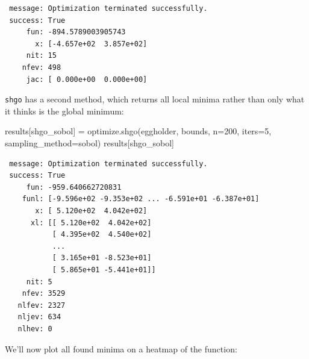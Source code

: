 \documentclass[
  letterpaper,
  DIV=11,
  numbers=noendperiod]{scrreprt}
\newenvironment{Shaded}{\begin{snugshade}}{\end{snugshade}}
\newcommand{\DecValTok}[1]{\textcolor[rgb]{0.68,0.00,0.00}{#1}}
\newcommand{\NormalTok}[1]{\textcolor[rgb]{0.00,0.23,0.31}{#1}}
\newcommand{\OperatorTok}[1]{\textcolor[rgb]{0.37,0.37,0.37}{#1}}
\newcommand{\StringTok}[1]{\textcolor[rgb]{0.13,0.47,0.30}{#1}}
\begin{document}
\begin{verbatim}
 message: Optimization terminated successfully.
 success: True
     fun: -894.5789003905743
       x: [-4.657e+02  3.857e+02]
     nit: 15
    nfev: 498
     jac: [ 0.000e+00  0.000e+00]
\end{verbatim}

\texttt{shgo} has a second method, which returns all local minima rather
than only what it thinks is the global minimum:

\begin{Shaded}
\begin{Highlighting}[]
\NormalTok{results[}\StringTok{\textquotesingle{}shgo\_sobol\textquotesingle{}}\NormalTok{] }\OperatorTok{=}\NormalTok{ optimize.shgo(eggholder, bounds, n}\OperatorTok{=}\DecValTok{200}\NormalTok{, iters}\OperatorTok{=}\DecValTok{5}\NormalTok{,}
\NormalTok{                                      sampling\_method}\OperatorTok{=}\StringTok{\textquotesingle{}sobol\textquotesingle{}}\NormalTok{)}
\NormalTok{results[}\StringTok{\textquotesingle{}shgo\_sobol\textquotesingle{}}\NormalTok{]}
\end{Highlighting}
\end{Shaded}

\begin{verbatim}
 message: Optimization terminated successfully.
 success: True
     fun: -959.640662720831
    funl: [-9.596e+02 -9.353e+02 ... -6.591e+01 -6.387e+01]
       x: [ 5.120e+02  4.042e+02]
      xl: [[ 5.120e+02  4.042e+02]
           [ 4.395e+02  4.540e+02]
           ...
           [ 3.165e+01 -8.523e+01]
           [ 5.865e+01 -5.441e+01]]
     nit: 5
    nfev: 3529
   nlfev: 2327
   nljev: 634
   nlhev: 0
\end{verbatim}

We'll now plot all found minima on a heatmap of the function:
\end{document}
